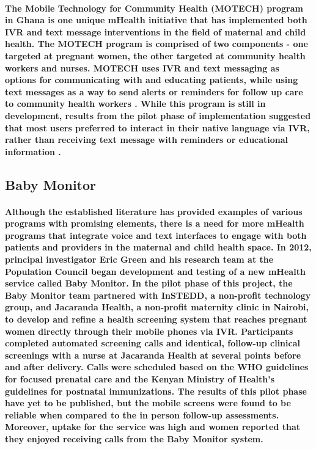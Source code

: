 \paragraph{The Mobile Technology for Community Health (MOTECH) program in Ghana is one unique mHealth initiative that has implemented both IVR and text message interventions in the field of maternal and child health. The MOTECH program is comprised of two components - one targeted at pregnant women, the other targeted at community health workers and nurses. MOTECH uses IVR and text messaging as options for communicating with and educating patients, while using text messages as a way to send alerts or reminders for follow up care to community health workers \citep{MOTECH2011}. While this program is still in development, results from the pilot phase of implementation suggested that most users preferred to interact in their native language via IVR, rather than receiving text message with reminders or educational information \citep{MOTECH2011}.}

\subsection{Baby Monitor}
\paragraph{Although the established literature has provided examples of various programs with promising elements, there is a need for more mHealth programs that integrate voice and text interfaces to engage with both patients and providers in the maternal and child health space. In 2012, principal investigator Eric Green and his research team at the Population Council began development and testing of a new mHealth service called Baby Monitor. In the pilot phase of this project, the Baby Monitor team partnered with InSTEDD, a non-profit technology group, and Jacaranda Health, a non-profit maternity clinic in Nairobi, to develop and refine a health screening system that reaches pregnant women directly through their mobile phones via IVR. Participants completed automated screening calls and identical, follow-up clinical screenings with a nurse at Jacaranda Health at several points before and after delivery. Calls were scheduled based on the WHO guidelines for focused prenatal care and the Kenyan Ministry of Health's guidelines for postnatal immunizations. The results of this pilot phase have yet to be published, but the mobile screens were found to be reliable when compared to the in person follow-up assessments. Moreover, uptake for the service was high and women reported that they enjoyed receiving calls from the Baby Monitor system.}


